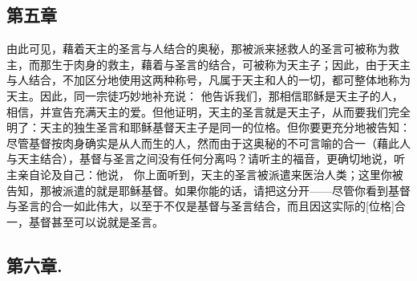 
\subsection{第五章}

\par

由此可见，藉着天主的圣言与人结合的奥秘，那被派来拯救人的圣言可被称为救主，而那生于肉身的救主，藉着与圣言的结合，可被称为天主子；因此，由于天主与人结合，不加区分地使用这两种称号，凡属于天主和人的一切，都可整体地称为天主。因此，同一宗徒巧妙地补充说：  他告诉我们，那相信耶稣是天主子的人，相信，并宣告充满天主的爱。但他证明，天主的圣言就是天主子，从而要我们完全明了：天主的独生圣言和耶稣基督天主子是同一的位格。但你要更充分地被告知：尽管基督按肉身确实是从人而生的人，然而由于这奥秘的不可言喻的合一（藉此人与天主结合），基督与圣言之间没有任何分离吗？请听主的福音，更确切地说，听主亲自论及自己：他说，  你上面听到，天主的圣言被派遣来医治人类；这里你被告知，那被派遣的就是耶稣基督。如果你能的话，请把这分开——尽管你看到基督与圣言的合一如此伟大，以至于不仅是基督与圣言结合，而且因这实际的[位格]合一，基督甚至可以说就是圣言。\par


\subsection{第六章.}

\par

